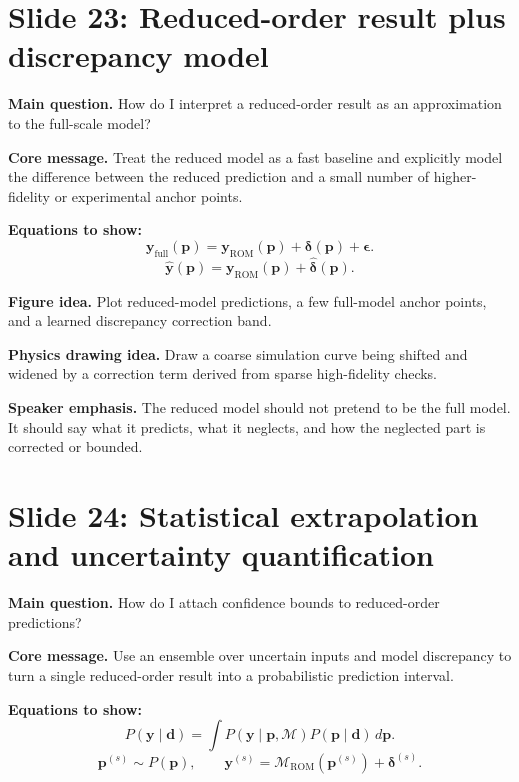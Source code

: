 \documentclass[11pt]{article}
\begin{document}
\section{Slide 23: Reduced-order result plus discrepancy model}
\begin{physicsbox}
\textbf{Main question.} How do I interpret a reduced-order result as an approximation to the full-scale model?
\end{physicsbox}

\textbf{Core message.} Treat the reduced model as a fast baseline and explicitly model the difference between the reduced prediction and a small number of higher-fidelity or experimental anchor points.

\textbf{Equations to show:}
\begin{equation*}
\mathbf{y}_{\mathrm{full}}(\mathbf{p})
=
\mathbf{y}_{\mathrm{ROM}}(\mathbf{p})+\boldsymbol{\delta}(\mathbf{p})+\boldsymbol{\epsilon}.
\end{equation*}
\begin{equation*}
\widehat{\mathbf{y}}(\mathbf{p})
=\mathbf{y}_{\mathrm{ROM}}(\mathbf{p})+\widehat{\boldsymbol{\delta}}(\mathbf{p}).
\end{equation*}

\textbf{Figure idea.} Plot reduced-model predictions, a few full-model anchor points, and a learned discrepancy correction band.

\textbf{Physics drawing idea.} Draw a coarse simulation curve being shifted and widened by a correction term derived from sparse high-fidelity checks.

\textbf{Speaker emphasis.} The reduced model should not pretend to be the full model. It should say what it predicts, what it neglects, and how the neglected part is corrected or bounded.

\section{Slide 24: Statistical extrapolation and uncertainty quantification}
\begin{physicsbox}
\textbf{Main question.} How do I attach confidence bounds to reduced-order predictions?
\end{physicsbox}

\textbf{Core message.} Use an ensemble over uncertain inputs and model discrepancy to turn a single reduced-order result into a probabilistic prediction interval.

\textbf{Equations to show:}
\begin{equation*}
P(\mathbf{y}\mid \mathbf{d})
=\int P(\mathbf{y}\mid \mathbf{p},\mathcal{M})P(\mathbf{p}\mid\mathbf{d})\,d\mathbf{p}.
\end{equation*}
\begin{equation*}
\mathbf{p}^{(s)}\sim P(\mathbf{p}),
\qquad
\mathbf{y}^{(s)}=\mathcal{M}_{\mathrm{ROM}}(\mathbf{p}^{(s)})+\boldsymbol{\delta}^{(s)}.
\end{equation*}
\end{document}

